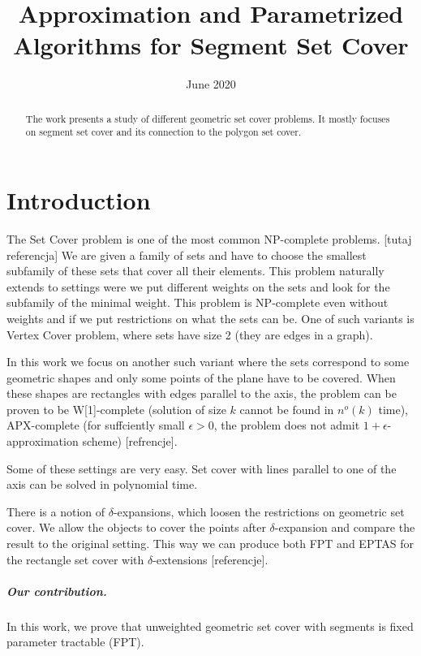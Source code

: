 \documentclass[en]{pracamgr}
\title{Approximation and Parametrized Algorithms for Segment Set Cover}
\date{June 2020}
\theoremstyle{plain}
\theoremstyle{definition}
\begin{document}
\maketitle

\begin{abstract}
  The work presents a study
  of different geometric set cover problems.
  It mostly focuses on segment set cover
  and its connection to the polygon set cover.
\end{abstract}

\tableofcontents

\chapter{Introduction}

The Set Cover problem is one of the most common NP-complete problems.
[tutaj referencja]
We are given a family of sets and have to choose the smallest
subfamily of these sets that cover all their elements.
This problem naturally extends to settings
were we put different weights on the sets
and look for the subfamily of the minimal weight.
This problem is NP-complete even 
without weights and if we put
restrictions on what the sets can be.
One of such variants is Vertex Cover problem,
where sets have size 2 (they are edges in a graph).

In this work we focus on another such variant where the sets correspond
to some geometric shapes and
only some points of the plane have to be covered.
When these shapes are rectangles with edges parallel
to the axis, the problem can be proven to
be W[1]-complete (solution of size $k$ cannot be found
in $n^o(k)$ time),
APX-complete (for suffciently small $\epsilon > 0$, the problem
does not admit $1+\epsilon$-approximation scheme)
[refrencje].

Some of these settings are very easy.
Set cover with lines parallel to one of the axis
can be solved in polynomial time.

There is a notion of $\delta$-expansions,
which loosen the restrictions on geometric set cover.
We allow the objects to cover the points
after $\delta$-expansion and compare
the result to the original setting.
This way we can produce both FPT and EPTAS
for the rectangle set cover with $\delta$-extensions
[referencje].



\paragraph{Our contribution.}
In this work, we prove that unweighted geometric set cover
with segments is fixed parameter tractable (FPT).
\end{document}
